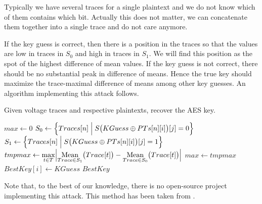 \begin{note}
	Typically we have several traces for a single plaintext and we do not know which of them contains which bit. Actually this does not matter, we can concatenate them together into a single trace and do not care anymore.
\end{note}

If the key guess is correct, then there is a position in the traces so that the values are low in traces in $S_0$ and high in traces in $S_1$. We will find this position as the spot of the highest difference of mean values. If the key guess is not correct, there should be no substantial peak in difference of means. Hence the true key should maximize the trace-maximal difference of means among other key guesses. An algorithm implementing this attack follows.

\begin{alg}
\label{alg:bitwisedpa}
Given voltage traces and respective plaintexts, recover the AES key.
	\begin{algorithmic}[1]
				\State $max \gets 0$
						\State $S_0 \gets \Bigl\{ Traces[n] \Bigm| S\bigl(KGuess\oplus PTs[n][i]\bigr)[j] = 0 \Bigr\}$
						\State $S_1 \gets \Bigl\{ Traces[n] \Bigm| S\bigl(KGuess\oplus PTs[n][i]\bigr)[j] = 1 \Bigr\}$
						\State $tmpmax \gets \max\limits_{t\in T} \Bigl| \operatorname*{Mean}\limits_{Trace\in S_1}\bigl(Trace[t]\bigr) - \operatorname*{Mean}\limits_{Trace\in S_0}\bigl(Trace[t]\bigr) \Bigr|$
							\State $max \gets tmpmax$
							\State $BestKey[i] \gets KGuess$
						\EndIf
					\EndFor
				\EndFor
			\EndFor
			\State\Return $BestKey$
		\EndFunction
	\end{algorithmic}
\end{alg}

Note that, to the best of our knowledge, there is no open-source project implementing this attack. This method has been taken from \cite{teuwen2015movfuscator}.

